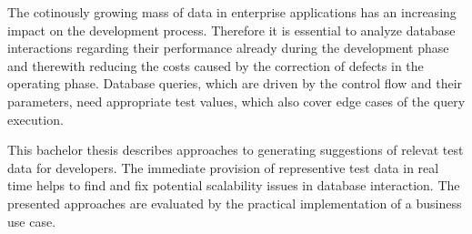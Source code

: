 {
The cotinously growing mass of data in enterprise applications has an increasing impact on the development process.
Therefore it is essential to analyze database interactions regarding their performance already during the development phase and therewith reducing the costs caused by the correction of defects in the operating phase.
Database queries, which are driven by the control flow and their parameters, need appropriate test values, which also cover edge cases of the query execution.

This bachelor thesis describes approaches to generating suggestions of relevat test data for developers.
The immediate provision of representive test data in real time helps to find and fix potential scalability issues in database interaction.
The presented approaches are evaluated by the practical implementation of a business use case.

}
